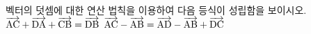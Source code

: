 벡터의 덧셈에 대한 연산 법칙을 이용하여 다음 등식이 성립함을 보이시오.
 $\overrightarrow{\mathrm{AC}}+\overrightarrow{\mathrm{DA}}+\overrightarrow{\mathrm{CB}}=\overrightarrow{\mathrm{DB}}$
 $\overrightarrow{\mathrm{AC}}-\overrightarrow{\mathrm{AB}}=\overrightarrow{\mathrm{AD}}-\overrightarrow{\mathrm{AB}}+\overrightarrow{\mathrm{DC}}$

